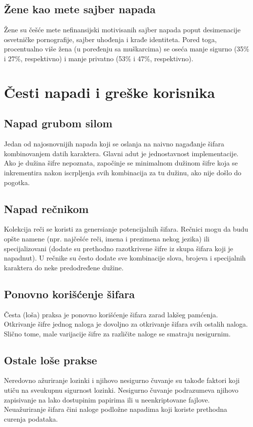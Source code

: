 \documentclass[fleqn, 12pt]{article}
\begin{document}
\subsection{Žene kao mete sajber napada}
\indent Žene su češće mete nefinansijski motivisanih sajber napada poput desimenacije osvetničke pornografije, sajber uhođenja i krađe identiteta. Pored toga, procentualno više žena (u poređenju sa muškarcima) se oseća manje sigurno (35\% i 27\%, respektivno) i manje privatno (53\% i 47\%, respektivno). \cite{zene} \cite{zene2}


\newpage
\section{Česti napadi i greške korisnika}

\subsection{Napad grubom silom}
\indent Jedan od najosnovnijih napada koji se oslanja na naivno nagađanje šifara kombinovanjem datih karaktera. Glavni adut je jednostavnost implementacije. Ako je dužina šifre nepoznata, započinje se minimalnom dužinom šifre koja se inkrementira nakon iscrpljenja svih kombinacija za tu dužinu, ako nije došlo do pogotka.\cite{napadi}

\subsection{Napad rečnikom}
\indent Kolekcija reči se koristi za genersianje potencijalnih šifara. Rečnici mogu da budu opšte namene (npr. najčešće reči, imena i prezimena nekog jezika) ili specijalizovani (dodate su prethodno razotkrivene šifre iz skupa šifara koji je napadnut). U rečnike su često dodate sve kombinacije slova, brojeva i specijalnih karaktera do neke predodređene dužine. \cite{napadi}

\subsection{Ponovno korišćenje šifara}
\indent Česta (loša) praksa je ponovno korišćenje šifara zarad lakšeg pamćenja. Otkrivanje šifre jednog naloga je dovoljno za otkrivanje šifara svih ostalih naloga. Slično tome, male varijacije šifre za različite naloge se smatraju nesigurnim.

\subsection{Ostale loše prakse}
\indent Neredovno ažuriranje lozinki i njihovo nesigurno čuvanje su takođe faktori koji utiču na sveukupnu sigurnost lozinki. Nesigurno čuvanje podrazumeva njihovo zapisivanje na lako dostupinim papirima ili u neenkriptovane fajlove. Neuažuriranje šifara čini naloge podložne napadima koji koriste prethodna curenja podataka. 
\end{document}

